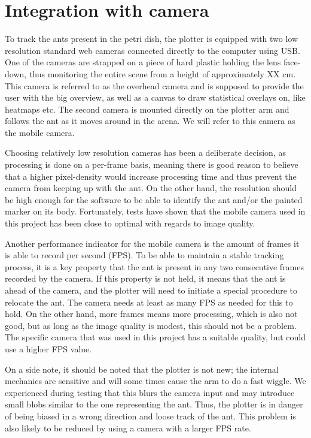 
\section{Integration with camera}

To track the ants present in the petri dish, the plotter is equipped with two low resolution standard web cameras connected directly to the computer using USB. One of the cameras are strapped on a piece of hard plastic holding the lens face-down, thus monitoring the entire scene from a height of approximately XX cm. This camera is referred to as the overhead camera and is supposed to provide the user with the big overview, as well as a canvas to draw statistical overlays on, like heatmaps etc. The second camera is mounted directly on the plotter arm and follows the ant as it moves around in the arena. We will refer to this camera as the mobile camera.

Choosing relatively low resolution cameras has been a deliberate decision, as processing is done on a per-frame basis, meaning there is good reason to believe that a higher pixel-density would increase processing time and thus prevent the camera from keeping up with the ant. On the other hand, the resolution should be high enough for the software to be able to identify the ant and/or the painted marker on its body. Fortunately, tests have shown that the mobile camera used in this project has been close to optimal with regards to image quality.

Another performance indicator for the mobile camera is the amount of frames it is able to record per second (FPS). To be able to maintain a stable tracking process, it is a key property that the ant is present in any two consecutive frames recorded by the camera. If this property is not held, it means that the ant is ahead of the camera, and the plotter will need to initiate a special procedure to relocate the ant. The camera needs at least as many FPS as needed for this to hold. On the other hand, more frames means more processing, which is also not good, but as long as the image quality is modest, this should not be a problem. The specific camera that was used in this project has a suitable quality, but could use a higher FPS value.

On a side note, it should be noted that the plotter is not new; the internal mechanics are sensitive and will some times cause the arm to do a fast wiggle. We experienced during testing that this blurs the camera input and may introduce small blobs similar to the one representing the ant. Thus, the plotter is in danger of being biased in a wrong direction and loose track of the ant. This problem is also likely to be reduced by using a camera with a larger FPS rate.

